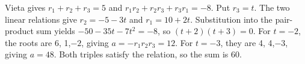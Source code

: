 Vieta gives $r_1+r_2+r_3=5$ and $r_1r_2+r_2r_3+r_3r_1=-8$. Put $r_3=t$. The two linear relations give $r_2=-5-3t$ and $r_1=10+2t$. Substitution into the pair-product sum yields $-50-35t-7t^2=-8$, so $(t+2)(t+3)=0$. For $t=-2$, the roots are 6, 1,$-2$, giving $a=-r_1r_2r_3=12$. For $t=-3$, they are 4, 4,$-3$, giving $a=48$. Both triples satisfy the relation, so the sum is $\boxed{60}$.
